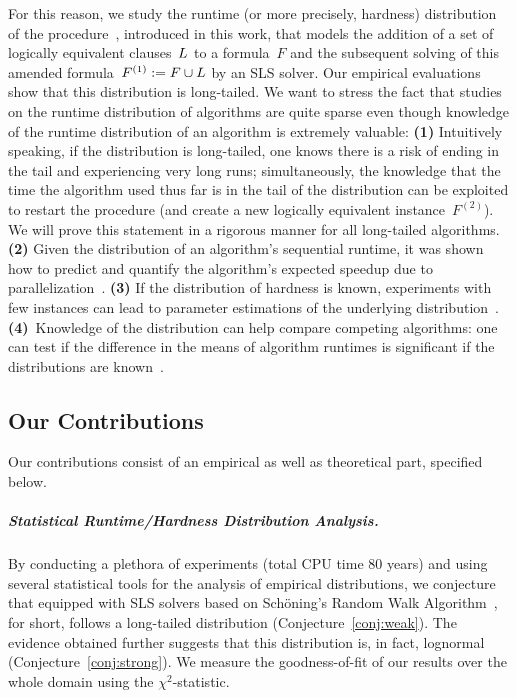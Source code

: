 For this reason, we study the runtime (or more precisely, hardness) distribution of the procedure~\Alfa{}, introduced in this work, that models the addition of a set of logically equivalent clauses~$L$ to a formula~$F$ and the subsequent solving of this amended formula~$F^{(1)} := F \cup L$ by an SLS solver.
Our empirical evaluations show that this distribution is long-tailed.
We want to stress the fact that studies on the runtime distribution of algorithms are quite sparse %
even though
knowledge of the runtime distribution of an algorithm is extremely valuable:
\textcolor{lipicsGray}{\textbf{(1)}}
Intuitively speaking, if the distribution is %
long-tailed, one knows there is a risk of ending in the tail and experiencing very long runs;
simultaneously, the knowledge that the time the algorithm used thus far is in the tail of the distribution can be exploited to restart the procedure (and create a new logically equivalent instance~$F^{(2)}$).
We will prove this statement in a rigorous manner 
for all long-tailed algorithms.
\textcolor{lipicsGray}{\textbf{(2)}}
Given the distribution of an algorithm's sequential runtime, it was shown 
how to predict and quantify the algorithm's expected speedup due to parallelization~\cite{ATCTC13UsingSequentialRuntimeDistributions}. %
\textcolor{lipicsGray}{\textbf{(3)}}
If the distribution of hardness is known, 
experiments with 
few
instances can lead to 
parameter estimations
of the underlying distribution~\cite{FRV97SummarizingCSPHardness}.	
\textcolor{lipicsGray}{\textbf{(4)}}~Knowledge of the distribution can help 
compare competing algorithms: %
one can test if the difference in the means of 
algorithm runtimes is significant if the distributions are known~\cite{FRV97SummarizingCSPHardness}.


\subsection{Our Contributions}


Our contributions consist of an empirical as well as theoretical part, specified below.

\subparagraph*{Statistical Runtime/Hardness Distribution Analysis.}


By conducting a plethora of experiments (total CPU time $80$ years) and using several statistical tools for the analysis of 
empirical
distributions,
we conjecture that
\Alfa{} equipped with SLS solvers based on Schöning's Random Walk Algorithm~\cite{Schoening02AProbabilisticAlgorithm}, \SRWA{} for short, follows a long-tailed distribution (Conjecture~\ref{conj:weak}).
The evidence obtained further suggests that this distribution is, in fact, lognormal (Conjecture~\ref{conj:strong}).
We measure the goodness-of-fit of our results over the whole domain using the $\chi^2$-statistic.


